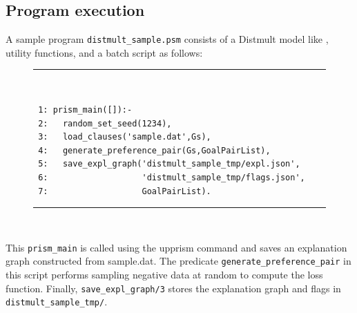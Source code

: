 \documentclass[a4paper]{report}
\begin{document}
\subsection*{Program execution}
A sample program \verb|distmult_sample.psm| consists of a Distmult model like , utility functions, and a batch script as follows: 

\begin{figure}[h]
	\rule{0.85\textwidth}{0.10mm}\\ [-1em]
\begin{verbatim}
 1: prism_main([]):-
 2:   random_set_seed(1234),
 3:   load_clauses('sample.dat',Gs),
 4:   generate_preference_pair(Gs,GoalPairList),
 5:   save_expl_graph('distmult_sample_tmp/expl.json',
 6:                   'distmult_sample_tmp/flags.json',
 7:                   GoalPairList).
\end{verbatim}
\rule{0.85\textwidth}{0.10mm}\\ [-1em]
\end{figure}

This \verb|prism_main| is called using the upprism command and saves an explanation graph constructed from sample.dat.
The predicate \verb|generate_preference_pair| in this script performs sampling negative data at random to compute the loss function.
Finally, \verb|save_expl_graph/3| stores the explanation graph and flags in \verb|distmult_sample_tmp/|.
\end{document}
